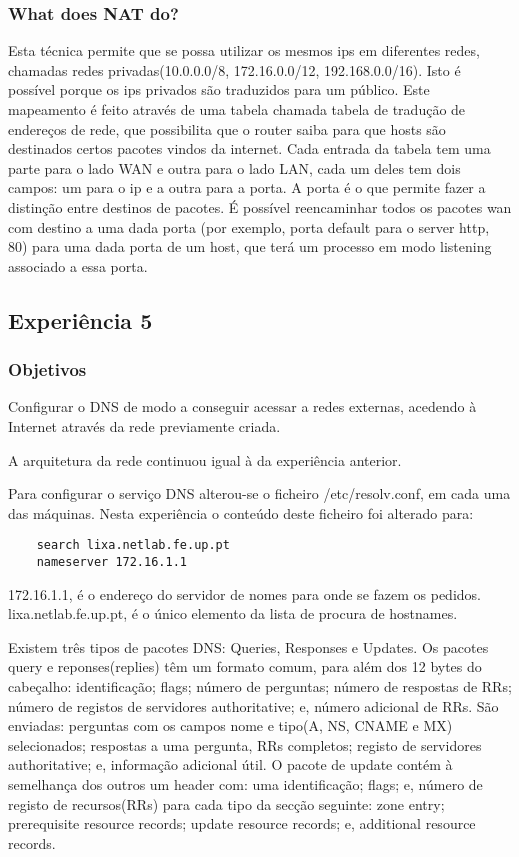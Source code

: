\documentclass[a4paper]{article}
\begin{document}
\subsubsection{What does NAT do?}
Esta técnica permite que se possa utilizar os mesmos ips em diferentes redes, chamadas redes privadas(10.0.0.0/8, 172.16.0.0/12, 192.168.0.0/16). Isto é possível porque os ips privados são traduzidos para um público. Este mapeamento é feito através de uma tabela chamada tabela de tradução de endereços de rede, que possibilita que o router saiba para que hosts são destinados certos pacotes vindos da internet. Cada entrada da tabela tem uma parte para o lado WAN e outra para o lado LAN, cada um deles tem dois campos: um para o ip e a outra para a porta. A porta é o que permite fazer a distinção entre destinos de pacotes. É possível reencaminhar todos os pacotes wan com destino a uma dada porta (por exemplo, porta default para o server http, 80) para uma dada porta de um host, que terá um processo em modo listening associado a essa porta.

\subsection{Experiência 5}

\subsubsection{Objetivos}
Configurar o DNS de modo a conseguir acessar a redes externas, acedendo à Internet através da rede previamente criada.

A arquitetura da rede continuou igual à da experiência anterior.

Para configurar o serviço DNS alterou-se o ficheiro /etc/resolv.conf, em cada uma das máquinas. Nesta experiência o conteúdo deste ficheiro foi alterado para:

\begin{verbatim}
	search lixa.netlab.fe.up.pt
	nameserver 172.16.1.1
\end{verbatim}

172.16.1.1, é o endereço do servidor de nomes para onde se fazem os pedidos. lixa.netlab.fe.up.pt, é o único elemento da lista de procura de hostnames.

Existem três tipos de pacotes DNS: Queries, Responses e Updates. Os pacotes query e reponses(replies) têm um formato comum, para além dos 12 bytes do cabeçalho: identificação; flags; número de perguntas; número de respostas de RRs; número de registos de servidores authoritative; e, número adicional de RRs. São enviadas: perguntas com os campos nome e tipo(A, NS, CNAME e MX) selecionados; respostas a uma pergunta, RRs completos; registo de servidores authoritative; e, informação adicional útil. O pacote de update contém à semelhança dos outros um header com: uma identificação; flags; e, número de registo de recursos(RRs) para cada tipo da secção seguinte: zone entry; prerequisite resource records; update resource records; e, additional resource records.
\end{document}
